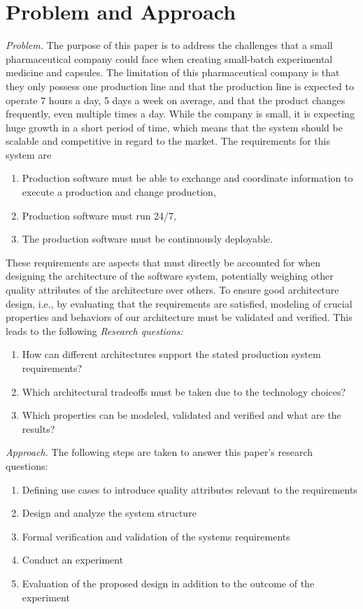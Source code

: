 \section{Problem and Approach}

\label{sec:problem}
\emph{Problem.}
The purpose of this paper is to address the challenges that a small pharmaceutical company could face when creating small-batch experimental medicine and capsules. The limitation of this pharmaceutical company is that they only possess one production line and that the production line is expected to operate 7 hours a day, 5 days a week on average, and that the product changes frequently, even multiple times a day. While the company is small, it is expecting huge growth in a short period of time, which means that the system should be scalable and competitive in regard to the market. The requirements for this system are 
\begin{enumerate}
    \item Production software must be able to exchange and coordinate information to execute a production and change production,
    \item Production software must run 24/7,
    \item The production software must be continuously deployable.
\end{enumerate}
These requirements are aspects that must directly be accounted for when designing the architecture of the software system, potentially weighing other quality attributes of the architecture over others. To ensure good architecture design, i.e., by evaluating that the requirements are satisfied, modeling of crucial properties and behaviors of our architecture must be validated and verified. 
This leads to the following 
\emph{Research questions:}
\begin{enumerate}
    \item  How can different architectures support the stated production system requirements?
    \item  Which architectural tradeoffs must be taken due to the technology choices?
    \item Which properties can be modeled, validated and verified and what are the results?
\end{enumerate}

\emph{Approach.}
The following steps are taken to answer this paper's research questions: 
\begin{enumerate}
    \item Defining use cases to introduce quality attributes relevant to the requirements
    \item Design and analyze the system structure
    \item Formal verification and validation of the systems requirements 
    \item Conduct an experiment
    \item Evaluation of the proposed design in addition to the outcome of the experiment
\end{enumerate}